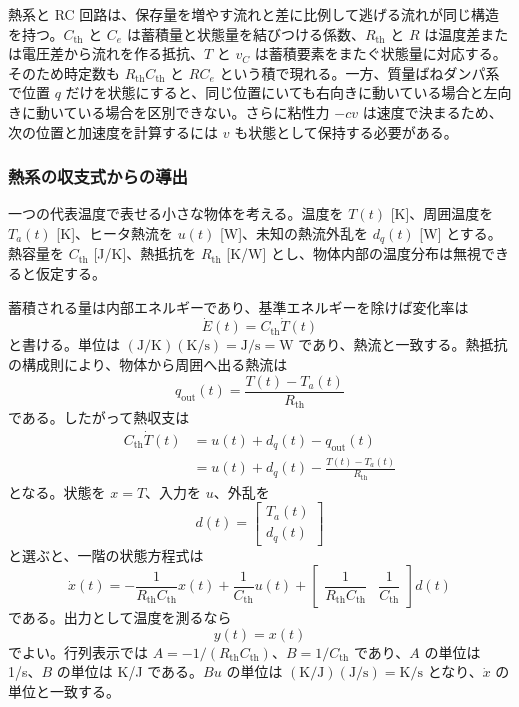 熱系と RC 回路は、保存量を増やす流れと差に比例して逃げる流れが同じ構造を持つ。$C_{\mathrm{th}}$ と $C_e$ は蓄積量と状態量を結びつける係数、$R_{\mathrm{th}}$ と $R$ は温度差または電圧差から流れを作る抵抗、$T$ と $v_C$ は蓄積要素をまたぐ状態量に対応する。そのため時定数も $R_{\mathrm{th}}C_{\mathrm{th}}$ と $RC_e$ という積で現れる。一方、質量ばねダンパ系で位置 $q$ だけを状態にすると、同じ位置にいても右向きに動いている場合と左向きに動いている場合を区別できない。さらに粘性力 $-cv$ は速度で決まるため、次の位置と加速度を計算するには $v$ も状態として保持する必要がある。

\subsubsection{熱系の収支式からの導出}

一つの代表温度で表せる小さな物体を考える。温度を $T(t)$ [K]、周囲温度を $T_a(t)$ [K]、ヒータ熱流を $u(t)$ [W]、未知の熱流外乱を $d_q(t)$ [W] とする。熱容量を $C_{\mathrm{th}}$ [J/K]、熱抵抗を $R_{\mathrm{th}}$ [K/W] とし、物体内部の温度分布は無視できると仮定する。

蓄積される量は内部エネルギーであり、基準エネルギーを除けば変化率は
\begin{equation}
  \dot{E}(t)=C_{\mathrm{th}}\dot{T}(t)
\end{equation}
と書ける。単位は $(\mathrm{J/K})(\mathrm{K/s})=\mathrm{J/s}=\mathrm{W}$ であり、熱流と一致する。熱抵抗の構成則により、物体から周囲へ出る熱流は
\begin{equation}
  q_{\mathrm{out}}(t)=\frac{T(t)-T_a(t)}{R_{\mathrm{th}}}
\end{equation}
である。したがって熱収支は
\begin{align}
  C_{\mathrm{th}}\dot{T}(t)
  &=u(t)+d_q(t)-q_{\mathrm{out}}(t)\\
  &=u(t)+d_q(t)-\frac{T(t)-T_a(t)}{R_{\mathrm{th}}}
\end{align}
となる。状態を $x=T$、入力を $u$、外乱を
\begin{equation}
  d(t)=\begin{bmatrix}T_a(t)\\ d_q(t)\end{bmatrix}
\end{equation}
と選ぶと、一階の状態方程式は
\begin{equation}
  \dot{x}(t)
  =-\frac{1}{R_{\mathrm{th}}C_{\mathrm{th}}}x(t)
   +\frac{1}{C_{\mathrm{th}}}u(t)
   +\begin{bmatrix}
      \dfrac{1}{R_{\mathrm{th}}C_{\mathrm{th}}}&
      \dfrac{1}{C_{\mathrm{th}}}
    \end{bmatrix}d(t)
\end{equation}
である。出力として温度を測るなら
\begin{equation}
  y(t)=x(t)
\end{equation}
でよい。行列表示では $A=-1/(R_{\mathrm{th}}C_{\mathrm{th}})$、$B=1/C_{\mathrm{th}}$ であり、$A$ の単位は 1/s、$B$ の単位は K/J である。$B u$ の単位は $(\mathrm{K/J})(\mathrm{J/s})=\mathrm{K/s}$ となり、$\dot{x}$ の単位と一致する。

